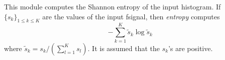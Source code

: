 This module computes the Shannon entropy of the input histogram. 
If $\{s_k\}_{1\leq k\leq K}$ are the values of the input fsignal, 
then {\em entropy} computes
\[
- \sum_{k=1}^K \tilde{s}_k \log \tilde{s}_k
\]
where $\tilde{s}_k = s_k / (\sum_{l=1}^K s_l)$.
It is assumed that the $s_k$'s are positive. 
